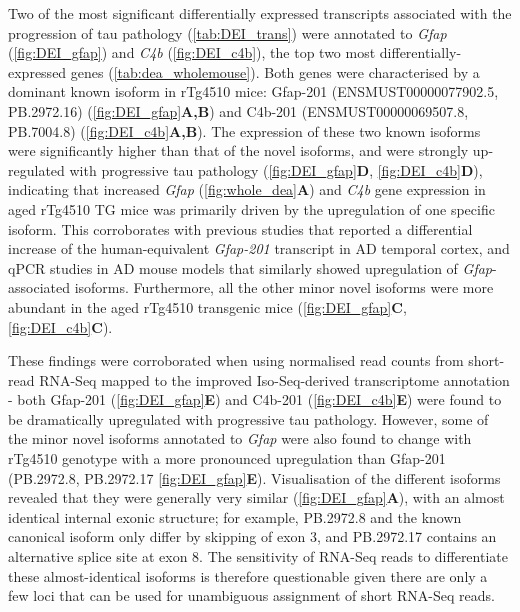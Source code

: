 Two of the most significant differentially expressed transcripts associated with the progression of tau pathology (\cref{tab:DEI_trans}) were annotated to \textit{Gfap} (\cref{fig:DEI_gfap}) and \textit{C4b} (\cref{fig:DEI_c4b}), the top two most differentially-expressed genes (\cref{tab:dea_wholemouse}). Both genes were characterised by a dominant known isoform in rTg4510 mice: Gfap-201 (ENSMUST00000077902.5, PB.2972.16) (\cref{fig:DEI_gfap}\textbf{A,B}) and C4b-201 (ENSMUST00000069507.8, PB.7004.8) (\cref{fig:DEI_c4b}\textbf{A,B}). The expression of these two known isoforms were significantly higher than that of the novel isoforms, and were strongly up-regulated with progressive tau pathology (\cref{fig:DEI_gfap}\textbf{D}, \cref{fig:DEI_c4b}\textbf{D}), indicating that increased \textit{Gfap} (\cref{fig:whole_dea}\textbf{A}) and \textit{C4b} gene expression in aged rTg4510 TG mice was primarily driven by the upregulation of one specific isoform. This corroborates with previous studies that reported a differential increase of the human-equivalent \textit{Gfap-201} transcript in AD temporal cortex\cite{Roelofs2005}, and qPCR studies in AD mouse models that similarly showed upregulation of \textit{Gfap}-associated isoforms\cite{Kamphuis2012}. Furthermore, all the other minor novel isoforms were more abundant in the aged rTg4510 transgenic mice (\cref{fig:DEI_gfap}\textbf{C}, \cref{fig:DEI_c4b}\textbf{C}).

These findings were corroborated when using normalised read counts from short-read RNA-Seq mapped to the improved Iso-Seq-derived transcriptome annotation - both Gfap-201 (\cref{fig:DEI_gfap}\textbf{E}) and C4b-201 (\cref{fig:DEI_c4b}\textbf{E}) were found to be dramatically upregulated with progressive tau pathology. However, some of the minor novel isoforms annotated to \textit{Gfap} were also found to change with rTg4510 genotype with a more pronounced upregulation than Gfap-201 (PB.2972.8, PB.2972.17 \cref{fig:DEI_gfap}\textbf{E}). Visualisation of the different isoforms revealed that they were generally very similar (\cref{fig:DEI_gfap}\textbf{A}), with an almost identical internal exonic structure; for example, PB.2972.8 and the known canonical isoform only differ by skipping of exon 3, and PB.2972.17 contains an alternative splice site at exon 8. The sensitivity of RNA-Seq reads to differentiate these almost-identical isoforms is therefore questionable given there are only a few loci that can be used for unambiguous assignment of short RNA-Seq reads.  

